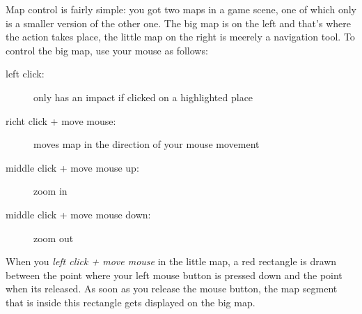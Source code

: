 Map control is fairly simple: you got two maps in a game scene, one of which only is a smaller version of the other one. The big map is on the left and that's where the action takes place, the little map on the right is meerely a navigation tool. To control the big map, use your mouse as follows:

  \begin{description}
    \item[left click:] only has an impact if clicked on a highlighted place
    \item[richt click + move mouse:] moves map in the direction of your mouse movement
    \item[middle click + move mouse up:] zoom in
    \item[middle click + move mouse down:] zoom out
  \end{description}

  When you \emph{left click + move mouse} in the little map, a red rectangle is drawn between the point where your left mouse button is pressed down and the point when its released. As soon as you release the mouse button, the map segment that is inside this rectangle gets displayed on the big map.
